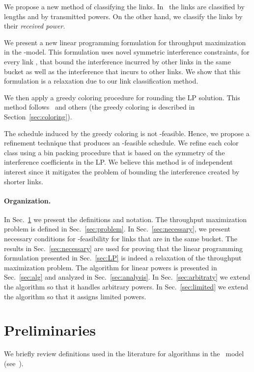 \documentclass[11pt]{article}
\newenvironment{proof sketch}{\noindent {\bf Proof sketch:} }{\hfill \qed}
\newcommand{\sinr}{\text{\sc{sinr}}}
\begin{document}
We propose a new method of classifying the links.
In~\cite{ChafekarCapacity,halldorsson2009wireless} the links are classified by lengths and by
transmitted powers.
On the other hand, we classify the links by their \emph{received power}.

We present a new linear programming formulation for throughput
maximization in the \sinr-model.  This
formulation uses novel symmetric interference constraints, for every link , that
bound the interference incurred by other links in the same bucket as well as the
interference that  incurs to other links.
We show that this formulation is a relaxation due to our link classification method.

We then apply a greedy coloring procedure for rounding the LP
solution. This method
follows~\cite{alicherry2005joint,ChafekarCapacity,wan2009multiflows}
and others (the greedy coloring is described in Section~\ref{sec:coloring}).

The schedule induced by the greedy coloring is not \sinr-feasible.
Hence, we propose a refinement technique that produces an \sinr-feasible schedule.
We refine each color class using a bin packing procedure that is based
on the symmetry of the interference coefficients in the LP. We believe
this method is of independent interest since it mitigates the problem
of bounding the interference created by
shorter links.

\paragraph{Organization.}
In Sec.~\ref{sec:prelim} we present the definitions and notation.  The
throughput maximization problem is defined in Sec.~\ref{sec:problem}.
In Sec.~\ref{sec:necessary}, we present necessary conditions for
\sinr-feasibility for links that are in the same bucket.  The results
in Sec.~\ref{sec:necessary} are used for proving that the linear
programming formulation presented in Sec.~\ref{sec:LP} is indeed a
relaxation of the throughput maximization problem.  The algorithm for
linear powers is presented in Sec.~\ref{sec:alg} and analyzed in
Sec.~\ref{sec:analysis}. In Sec.~\ref{sec:arbitraty} we extend the algorithm so that it handles arbitrary powers.
In Sec.~\ref{sec:limited} we extend the algorithm so that it assigns limited powers.

\section{Preliminaries}
\label{sec:prelim}
We briefly review definitions used in the literature for algorithms in
the \sinr\ model (see~\cite{HW,ChafekarCapacity}).
\end{document}
